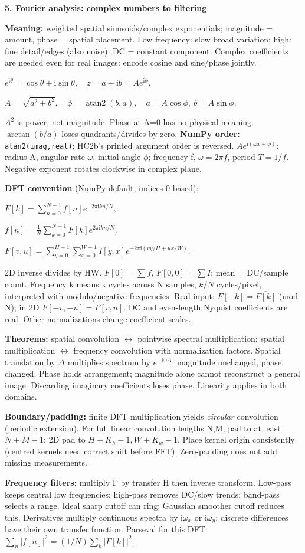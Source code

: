 \documentclass[a4paper]{article}
\newcommand{\key}[1]{\textbf{#1}}
\newcommand{\Topic}[1]{\par\vspace{1.7pt}\noindent
  {\fontsize{7.7}{8.0}\selectfont\bfseries #1}\par\vspace{0.3pt}}
\newcommand{\eq}[1]{\par\noindent\mbox{\(\displaystyle #1\)}\par}
\newcommand{\ii}{\mathrm i}
\newcounter{sheet}
\newcounter{sheetcolumn}
\newlength{\colwidth}
\newenvironment{sheetcol}[1][7.0]{\stepcounter{sheetcolumn}
  \begin{lrbox}{\columnbox}\begin{minipage}[t]{\colwidth}\vspace{0pt}
  \fontsize{#1}{\dimexpr#1pt+0.6pt\relax}\selectfont}
  {\end{minipage}\end{lrbox}
  \typeout{CV1COL|\thesheet|\thesheetcolumn|\the\dimexpr\ht\columnbox+\dp\columnbox\relax}
  \usebox{\columnbox}\ignorespacesafterend}
\begin{document}
\begin{sheetcol}[6.75]
\Topic{5. Fourier analysis: complex numbers to filtering}
\key{Meaning:} weighted spatial sinusoids/complex exponentials; magnitude = amount, phase = spatial placement. Low frequency: slow broad variation; high: fine detail/edges (also noise). DC = constant component. Complex coefficients are needed even for real images: encode cosine and sine/phase jointly.
\eq{e^{\ii\theta}=\cos\theta+\ii\sin\theta,\quad
 z=a+\ii b=Ae^{\ii\phi},}
\eq{A=\sqrt{a^2+b^2},\quad\phi=\operatorname{atan2}(b,a),\quad
 a=A\cos\phi,\ b=A\sin\phi.}
\(A^2\) is power, not magnitude. Phase at A=0 has no physical meaning. \(\arctan(b/a)\) loses quadrants/divides by zero. \key{NumPy order:} \texttt{atan2(imag,real)}; HC2b's printed argument order is reversed. \(Ae^{\ii(\omega x+\phi)}\): radius A, angular rate \(\omega\), initial angle \(\phi\); frequency f, \(\omega=2\pi f\), period \(T=1/f\). Negative exponent rotates clockwise in complex plane.

\key{DFT convention} (NumPy default, indices 0-based):
\eq{F[k]=\sum_{n=0}^{N-1}f[n]e^{-2\pi\ii kn/N},}
\eq{f[n]=\frac1N\sum_{k=0}^{N-1}F[k]e^{2\pi\ii kn/N}.}
\eq{F[v,u]=\sum_{y=0}^{H-1}\sum_{x=0}^{W-1}I[y,x]
 e^{-2\pi\ii(vy/H+ux/W)}.}
2D inverse divides by HW. \(F[0]=\sum f\), \(F[0,0]=\sum I\); mean = DC/sample count. Frequency k means k cycles across N samples, \(k/N\) cycles/pixel, interpreted with modulo/negative frequencies. Real input: \(F[-k]=\overline{F[k]}\) (mod N); in 2D \(F[-v,-u]=\overline{F[v,u]}\). DC and even-length Nyquist coefficients are real. Other normalizations change coefficient scales.

\key{Theorems:} spatial convolution \(\leftrightarrow\) pointwise spectral multiplication; spatial multiplication \(\leftrightarrow\) frequency convolution with normalization factors. Spatial translation by \(\Delta\) multiplies spectrum by \(e^{-\ii\omega\Delta}\): magnitude unchanged, phase changed. Phase holds arrangement; magnitude alone cannot reconstruct a general image. Discarding imaginary coefficients loses phase. Linearity applies in both domains.

\key{Boundary/padding:} finite DFT multiplication yields \emph{circular} convolution (periodic extension). For full linear convolution lengths N,M, pad to at least \(N+M-1\); 2D pad to \(H+K_h-1,W+K_w-1\). Place kernel origin consistently (centred kernels need correct shift before FFT). Zero-padding does not add missing measurements.

\key{Frequency filters:} multiply F by transfer H then inverse transform. Low-pass keeps central low frequencies; high-pass removes DC/slow trends; band-pass selects a range. Ideal sharp cutoff can ring; Gaussian smoother cutoff reduces this. Derivatives multiply continuous spectra by \(\ii\omega_x\) or \(\ii\omega_y\); discrete differences have their own transfer function. Parseval for this DFT: \(\sum_n|f[n]|^2=(1/N)\sum_k|F[k]|^2\).


\end{sheetcol}
\end{document}
